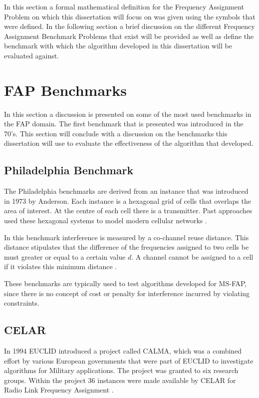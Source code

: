 In this section a formal mathematical definition for the Frequency Assignment Problem on which this dissertation will focus on was given using the symbols that were defined. In the following section a brief discussion on the different Frequency Assignment Benchmark Problems that exist will be provided as well as define the benchmark with which the algorithm developed in this dissertation will be evaluated against.
\section{FAP Benchmarks}
\label{sec:FAPBenchmarks}
In this section a discussion is presented on some of the most used benchmarks in the FAP domain. The first benchmark that is presented was introduced in the 70's. This section will conclude with a discussion on the benchmarks this dissertation will use to evaluate the effectiveness of the algorithm that developed.
\subsection{Philadelphia Benchmark}
The Philadelphia benchmarks are derived from an instance that was introduced in 1973 by Anderson. Each instance is a hexagonal grid of cells that overlaps the area of interest. At the centre of each cell there is a transmitter. Past approaches used these hexagonal systems to model modern cellular networks \cite{Karen2004,ExactMIFAP}.

In this benchmark interference is measured by a co-channel reuse distance. This distance stipulates that the difference of the frequencies  assigned to two cells be must greater or equal to a certain value $d$. A channel cannot be assigned to a cell if it violates this minimum distance \cite{Karen2004,ExactMIFAP}.

These benchmarks are typically used to test algorithms developed for MS-FAP, since there is no concept of cost or penalty for interference incurred by violating constraints.
\subsection{CELAR}
In 1994 EUCLID introduced a project called CALMA, which was a combined effort by various European governments that were part of EUCLID to investigate algorithms for Military applications. The project was granted to six research groups. Within the project 36 instances were made available by CELAR for Radio Link Frequency Assignment \cite{Karen2004,DynamicFAP}.

